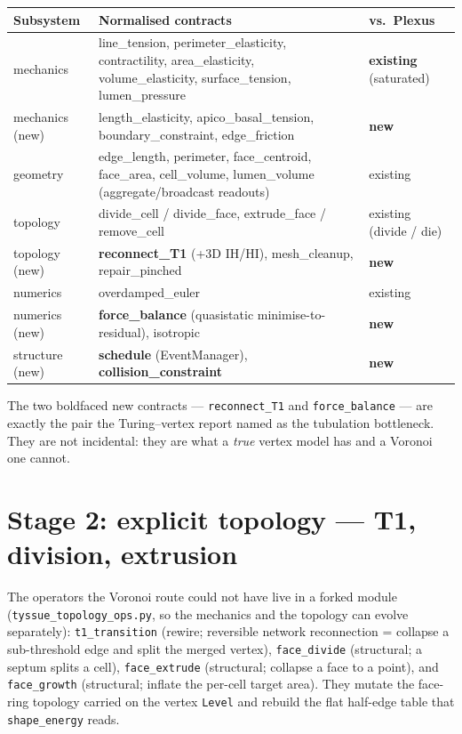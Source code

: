 \documentclass[11pt]{article}
\begin{document}
\begin{center}
\footnotesize
\renewcommand{\arraystretch}{1.15}
\begin{tabular}{@{}p{2.6cm}p{7.6cm}p{2.4cm}@{}}
\toprule
\textbf{Subsystem} & \textbf{Normalised contracts} & \textbf{vs.\ Plexus} \\
\midrule
mechanics & line\_tension, perimeter\_elasticity, contractility, area\_elasticity,
volume\_elasticity, surface\_tension, lumen\_pressure & \textbf{existing} (saturated) \\
mechanics (new) & length\_elasticity, apico\_basal\_tension, boundary\_constraint,
edge\_friction & \textbf{new} \\
geometry & edge\_length, perimeter, face\_centroid, face\_area, cell\_volume, lumen\_volume
(aggregate/broadcast readouts) & existing \\
topology & divide\_cell / divide\_face, extrude\_face / remove\_cell & existing (divide / die) \\
topology (new) & \textbf{reconnect\_T1} (+3D IH/HI), mesh\_cleanup, repair\_pinched & \textbf{new} \\
numerics & overdamped\_euler & existing \\
numerics (new) & \textbf{force\_balance} (quasistatic minimise-to-residual), isotropic & \textbf{new} \\
structure (new) & \textbf{schedule} (EventManager), \textbf{collision\_constraint} & \textbf{new} \\
\bottomrule
\end{tabular}
\end{center}

The two boldfaced new contracts --- \texttt{reconnect\_T1} and \texttt{force\_balance} --- are
exactly the pair the Turing--vertex report named as the tubulation bottleneck. They are not
incidental: they are what a \emph{true} vertex model has and a Voronoi one cannot.

\section{Stage 2: explicit topology --- T1, division, extrusion}
The operators the Voronoi route could not have live in a forked module
(\texttt{tyssue\_topology\_ops.py}, so the mechanics and the topology can evolve separately):
\texttt{t1\_transition} (rewire; reversible network reconnection = collapse a sub-threshold edge
and split the merged vertex), \texttt{face\_divide} (structural; a septum splits a cell),
\texttt{face\_extrude} (structural; collapse a face to a point), and \texttt{face\_growth}
(structural; inflate the per-cell target area). They mutate the face-ring topology carried on the
vertex \texttt{Level} and rebuild the flat half-edge table that \texttt{shape\_energy} reads.
\end{document}

